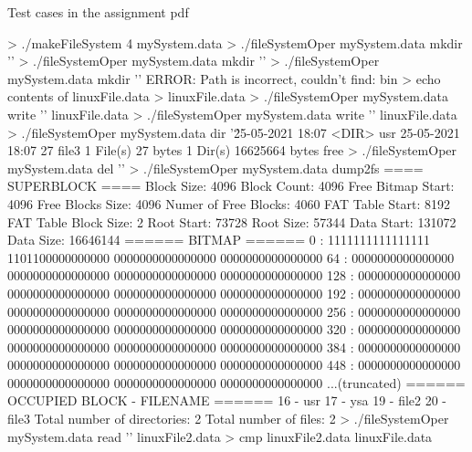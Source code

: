\documentclass[a4paper]{article}
\begin{document}
\newpage


Test cases in the assignment pdf

\begin{textcode} 
> ./makeFileSystem 4 mySystem.data
> ./fileSystemOper mySystem.data mkdir '\usr'
> ./fileSystemOper mySystem.data mkdir '\usr\ysa'
> ./fileSystemOper mySystem.data mkdir '\bin\ysa'
ERROR: Path is incorrect, couldn't find: bin
> echo contents of linuxFile.data > linuxFile.data
> ./fileSystemOper mySystem.data write '\usr{}' linuxFile.data
> ./fileSystemOper mySystem.data write '' linuxFile.data
> ./fileSystemOper mySystem.data dir '\'
25-05-2021  18:07  <DIR>         usr
25-05-2021  18:07            27  file3
         1 File(s)         27 bytes
         1 Dir(s)   16625664 bytes free
> ./fileSystemOper mySystem.data del '\usr\ysa{}'
> ./fileSystemOper mySystem.data dump2fs
==== SUPERBLOCK ====
Block Size:            4096
Block Count:           4096
Free Bitmap Start:     4096
Free Blocks Size:      4096
Numer of Free Blocks:  4060
FAT Table Start:       8192
FAT Table Block Size:  2
Root Start:            73728
Root Size:             57344
Data Start:            131072
Data Size:             16646144
====== BITMAP ======
    0 : 1111111111111111 1101100000000000 0000000000000000 0000000000000000
   64 : 0000000000000000 0000000000000000 0000000000000000 0000000000000000
  128 : 0000000000000000 0000000000000000 0000000000000000 0000000000000000
  192 : 0000000000000000 0000000000000000 0000000000000000 0000000000000000
  256 : 0000000000000000 0000000000000000 0000000000000000 0000000000000000
  320 : 0000000000000000 0000000000000000 0000000000000000 0000000000000000
  384 : 0000000000000000 0000000000000000 0000000000000000 0000000000000000
  448 : 0000000000000000 0000000000000000 0000000000000000 0000000000000000
...(truncated)
====== OCCUPIED BLOCK - FILENAME ======
16 - usr
17 - ysa
19 - file2
20 - file3
Total number of directories: 2
Total number of files: 2
> ./fileSystemOper mySystem.data read '\usr{}' linuxFile2.data
> cmp linuxFile2.data linuxFile.data
\end{textcode} 
\end{document}
